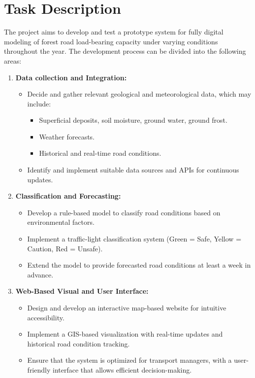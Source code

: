 \section{Task Description} %
The project aims to develop and test a prototype system for fully digital modeling of forest road load-bearing capacity under varying conditions throughout the year. The development process can be divided into the following areas:

\begin{enumerate}
    \item \textbf{Data collection and Integration:}
    \begin{itemize}
        \item Decide and gather relevant geological and meteorological data, which may include:
        \begin{itemize}
            \item Superficial deposits, soil moisture, ground water, ground frost.
            \item Weather forecasts.
            \item Historical and real-time road conditions.
        \end{itemize}
        \item Identify and implement suitable data sources and APIs for continuous updates.
    \end{itemize}
    
    \item \textbf{Classification and Forecasting:}
    \begin{itemize}
        \item Develop a rule-based model to classify road conditions based on environmental factors.  
        \item Implement a traffic-light classification system (Green = Safe, Yellow = Caution, Red = Unsafe).  
        \item Extend the model to provide forecasted road conditions at least a week in advance.  
    \end{itemize}
    
    \item \textbf{Web-Based Visual and User Interface:}
    \begin{itemize}
        \item Design and develop an interactive map-based website for intuitive accessibility.
        \item Implement a GIS-based visualization with real-time updates and historical road condition tracking. 
        \item Ensure that the system is optimized for transport managers, with a user-friendly interface that allows efficient decision-making. 
    \end{itemize}
    

\end{enumerate}
